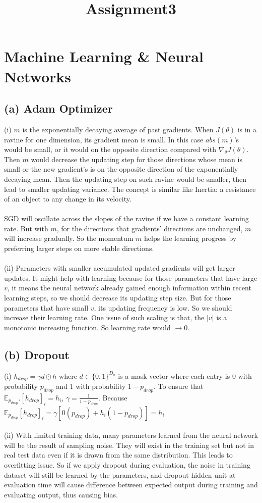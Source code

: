 \documentclass[11pt]{article}
\title{Assignment3}
\begin{document}
\maketitle
\section{Machine Learning \& Neural Networks}
\subsection{(a) Adam Optimizer}
(i) $m$ is the exponentially decaying average of past gradients. When $J(\theta)$ is in a ravine for one dimension, its gradient mean is small. In this case $abs(m)$'s would be small, or it would on the opposite direction compared with $\nabla_\theta J(\theta)$. Then $m$ would decrease the updating step for those directions whose mean is small or the new gradient's is on the opposite direction of the exponentially decaying mean. Then the updating step on such ravine would be smaller, then lead to smaller updating variance. The concept is similar like Inertia: a resistance of an object to any change in its velocity. \\\\
SGD will oscillate across the slopes of the ravine if we have a constant learning rate. But with $m$, for the directions that gradients' directions are unchanged, $m$ will increase gradually. So the momentum $m$ helps the learning progress by preferring larger steps on more stable directions.\\\\
(ii) Parameters with smaller accumulated updated gradients will get larger updates. It might help with learning because for those parameters that have large $v$, it means the neural network already gained enough information within recent learning steps, so we should decrease its updating step size. But for those parameters that have small $v$, its updating frequency is low. So we should increase their learning rate. One issue of such scaling is that, the $|v|$ is a monotonic increasing function. So learning rate would $\rightarrow 0$.
\subsection{(b) Dropout}
(i) $h_{drop} = \gamma d \odot h$ where $d \in \{0, 1\}^{D_h}$ is a mask vector where each entry is 0 with probability $p_{drop}$ and 1 with probability $1 - p_{drop}$. To ensure that $\mathbb{E}_{p_{drop}}.[h_{drop}]_i = h_i$, $\gamma = \frac{1}{1-p_{drop}}$. Because $\mathbb{E}_{p_{drop}}[h_{drop}]_i = \gamma[0(p_{drop})+h_i(1-p_{drop})] = h_i$\\\\
(ii) With limited training data, many parameters learned from the neural network
will be the result of sampling noise. They will exist in the training set but not in real
test data even if it is drawn from the same distribution. This leads to overfitting issue. So if we apply dropout during evaluation, the noise in training dataset will still be learned by the parameters, and dropout hidden unit at evaluation time will cause difference between expected output during training and evaluating output, thus causing bias.
\end{document}
